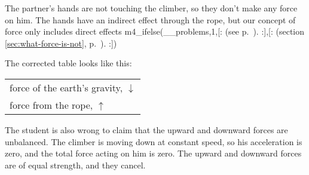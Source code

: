 The partner's hands are not touching the climber, so they don't make any force
on him. The hands have an indirect effect through the rope, but our concept of
force only includes direct effects 
m4_ifelse(__problems,1,[:%
(see p.~\pageref{force-is-direct}).%
:],[:%
(section \ref{sec:what-force-is-not}, p.~\pageref{sec:what-force-is-not}).%
:])

The corrected table looks like this:

\begin{tabular}{p{90mm}}
force of the earth's gravity, $\downarrow$ \\
force from the rope, $\uparrow$ \\
\end{tabular}

The student is also wrong to claim that the upward and downward forces are
unbalanced. The climber is moving down at constant speed, so his
acceleration is zero, and the total force acting on him is zero.
The upward and downward forces are of equal strength, and they
cancel.
